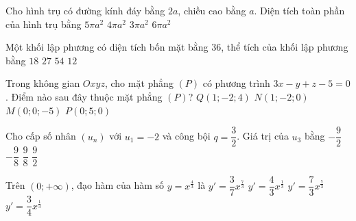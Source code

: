 \begin{ex}%
	Cho hình trụ có đường kính đáy bằng $2a$, chiều cao bằng $a$. Diện tích toàn phần của hình trụ bằng
	\choice
	{$5\pi a^2$}
	{\True $4\pi a^2$}
	{$3\pi a^2$}
	{$6\pi a^2$}
\end{ex}

\begin{ex}%
	Một khối lập phương có diện tích bốn mặt bằng $36$, thể tích của khối lập phương bằng
	\choice
	{$18$}
	{\True $27$}
	{$54$}
	{$12$}
\end{ex}

\begin{ex}%
	Trong không gian $Oxyz$, cho mặt phẳng $(P)$ có phương trình $3x-y+z-5=0$. Điểm nào sau đây thuộc mặt phẳng $(P)$?
	\choice
	{$Q(1;-2;4)$}
	{\True $N(1;-2;0)$}
	{$M(0;0;-5)$}
	{$P(0;5;0)$}
\end{ex}

\begin{ex}%
	Cho cấp số nhân $(u_n)$ với $u_1=-2$ và công bội $q=\dfrac{3}{2}$. Giá trị của $u_3$ bằng
	\choice
	{\True $-\dfrac{9}{2}$}
	{$-\dfrac{9}{8}$}
	{$\dfrac{9}{8}$}
	{$\dfrac{9}{2}$}
\end{ex}

\begin{ex}%
	Trên $(0;+\infty )$, đạo hàm của hàm số $y=x^{\tfrac{4}{3}}$ là
	\choice
	{$y'=\dfrac{3}{7}x^{\tfrac{7}{3}}$}
	{\True $y'=\dfrac{4}{3}x^{\tfrac{1}{3}}$}
	{$y'=\dfrac{7}{3}x^{\tfrac{7}{3}}$}
	{$y'=\dfrac{3}{4}x^{\tfrac{1}{3}}$}
\end{ex}

